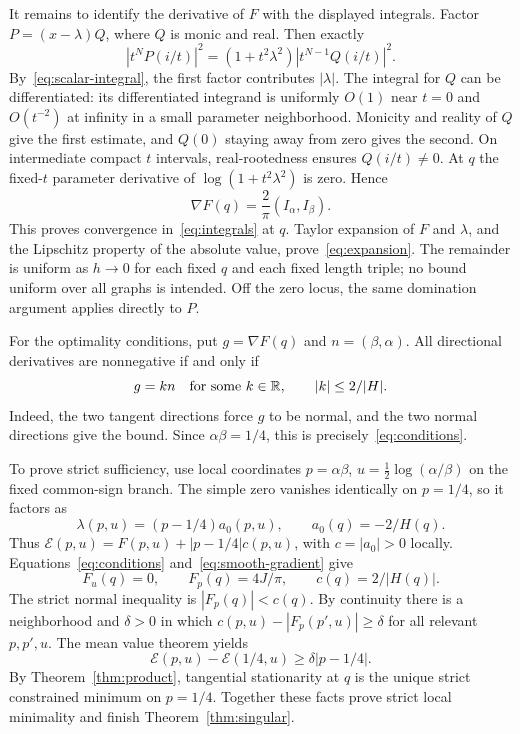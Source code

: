 \documentclass[11pt,a4paper]{article}
\theoremstyle{remark}
\newcommand{\E}{\mathcal E}
\newcommand{\R}{\mathbb R}
\begin{document}
It remains to identify the derivative of $F$ with the displayed
integrals. Factor $P=(x-\lambda)Q$, where $Q$ is monic and real.
Then exactly
\begin{equation}\label{eq:root-removed}
 |t^NP(i/t)|^2=(1+t^2\lambda^2)|t^{N-1}Q(i/t)|^2.
\end{equation}
By~\eqref{eq:scalar-integral}, the first factor contributes $|\lambda|$.
The integral for $Q$ can be differentiated: its differentiated
integrand is uniformly $O(1)$ near $t=0$ and $O(t^{-2})$ at infinity
in a small parameter neighborhood. Monicity and reality of $Q$
give the first estimate, and $Q(0)$ staying away from zero gives
the second. On intermediate compact $t$ intervals, real-rootedness
ensures $Q(i/t)\ne0$.
At $q$ the fixed-$t$ parameter derivative of
$\log(1+t^2\lambda^2)$ is zero. Hence
\begin{equation}\label{eq:smooth-gradient}
 \nabla F(q)=\frac2\pi(I_\alpha,I_\beta).
\end{equation}
This proves convergence in~\eqref{eq:integrals} at $q$.
Taylor expansion of $F$ and $\lambda$, and the Lipschitz property
of the absolute value, prove~\eqref{eq:expansion}. The remainder is
uniform as $h\to0$ for each fixed $q$ and each fixed length triple;
no bound uniform over all graphs is intended. Off the zero locus,
the same domination argument applies directly to $P$.

For the optimality conditions, put $g=\nabla F(q)$ and
$n=(\beta,\alpha)$. All directional derivatives are nonnegative
if and only if
\[
 g=kn\quad\hbox{for some }k\in\R,\qquad |k|\leq2/|H|.
\]
Indeed, the two tangent directions force $g$ to be normal, and
the two normal directions give the bound. Since $\alpha\beta=1/4$,
this is precisely~\eqref{eq:conditions}.

To prove strict sufficiency, use local coordinates $p=\alpha\beta$,
$u=\tfrac12\log(\alpha/\beta)$ on the fixed common-sign branch.
The simple zero vanishes identically on $p=1/4$, so it factors as
\[
 \lambda(p,u)=(p-1/4)a_0(p,u),\qquad a_0(q)=-2/H(q).
\]
Thus $\E(p,u)=F(p,u)+|p-1/4|c(p,u)$, with $c=|a_0|>0$ locally.
Equations~\eqref{eq:conditions} and~\eqref{eq:smooth-gradient} give
\[
 F_u(q)=0,\qquad F_p(q)=4J/\pi,\qquad c(q)=2/|H(q)|.
\]
The strict normal inequality is $|F_p(q)|<c(q)$.
By continuity there is a neighborhood and $\delta>0$ in which
$c(p,u)-|F_p(p',u)|\geq\delta$ for all relevant $p,p',u$.
The mean value theorem yields
\[
 \E(p,u)-\E(1/4,u)\geq\delta|p-1/4|.
\]
By Theorem~\ref{thm:product}, tangential stationarity at $q$
is the unique strict constrained minimum on $p=1/4$.
Together these facts prove strict local minimality and finish
Theorem~\ref{thm:singular}.
\end{document}
